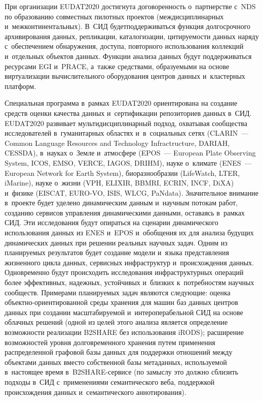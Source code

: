 \begin{multicols}{2}
При организации EUDAT2020 достигнута договоренность 
о~партнерстве с~NDS по образованию совместных пилотных проектов 
(междис\-цип\-линарных и~межконтинентальных). В~СИД будет\linebreak поддерживаться функция 
долгосрочного ар\-хи\-ви\-рования данных, репликации, каталогизации,\linebreak
 цитируемости данных 
наряду с~обеспечением обнаружения, доступа, повторного использования коллекций 
и~отдельных объектов данных. Функции анализа данных будут поддерживаться ресурсами 
EGI и~PRACE, а~так\-же средствами, образуемыми на основе виртуализации 
вычислительного оборудования центров данных и~кластерных платформ. 

Специальная 
программа в~рамках EUDAT2020 ориентирована на создание средств оценки качест\-ва 
данных и~сертификации репозиториев данных в~СИД. EUDAT2020 развивает 
мультидисциплинарный подход, охватывая сообщества исследователей в~гуманитарных 
областях и~в~социальных сетях (CLARIN~--- Common Language Resources and Technology Infractructure, 
DARIAH, CESSDA), в~науках о~Земле 
и~атмосфере (EPOS~--- European Plate Observing System, ICOS, EMSO, VERCE, IAGOS, DRIHM), 
науке о~климате (ENES~--- European Network for Earth System), 
биоразнообразии (LifeWatch, LTER, iMarine), науке о~жизни (VPH, ELIXIR, BBMRI, 
ECRIN, INCF, DiXA) и~физике (EISCAT, EURO-VO, ISIS, \mbox{WLCG}, PaNdata). Значительное 
внимание в~проекте будет уделено динамическим данным и~научным потокам работ, 
созданию сервисов управ\-ле\-ния динамическими данными, оставаясь в~рамках СИД. Эти 
исследования будут опираться на сценарии динамического использования данных из ENES 
и~EPOS и~обобщения их для анализа будущих динамических данных при решении 
реальных научных задач. Одним из планируемых результатов будет создание модели 
и~языка представления жизненного цикла данных, сервисных инфраструктур 
и~происхождения данных. Одновременно будут происходить исследования 
инфраструктурных операций более эффективных, надежных, устойчивых и~близких 
к~потребностям научных сообществ. Примерами планируемых задач являются следующие: 
оценка объектно-ориентированной среды хранения для машин баз данных центров данных 
при создании масштабируемой и~интероперабельной СИД на основе облачных решений 
(одной из целей этого анализа является определение возможности реализации B2SHARE 
без использования iRODS); расширение возможностей уровня долговременного хранения 
путем применения распределенной графовой базы данных для поддержки отношений 
между объектами данных вместо собственной базы метаданных, используемой 
в~настоящее время в~B2SHARE-сер\-ви\-се (по замыслу это должно сблизить подходы в~СИД 
с~применениями семантического веба, поддержкой происхождения данных 
и~семантического аннотирования).
{

}
\end{multicols}
